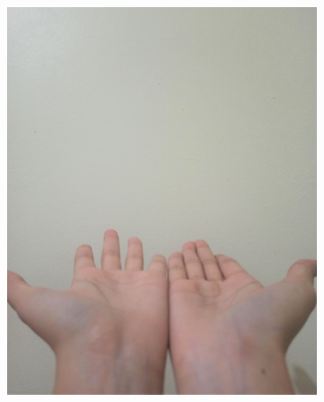 \documentclass[conference]{IEEEtran}
\begin{document}
\begin{figure} [h]
\begin{center}
\begin{subfigure}[t]{0.11\textwidth}
			\includegraphics[width=\textwidth]{img/pola6.jpg}
			\caption{\label{fig:gs6}}
		\end{subfigure}
		\hspace{0.1em}
		\begin{subfigure}[t]{0.11\textwidth}
			\centering

\end{subfigure}
\end{center}
\end{figure}
\end{document}
